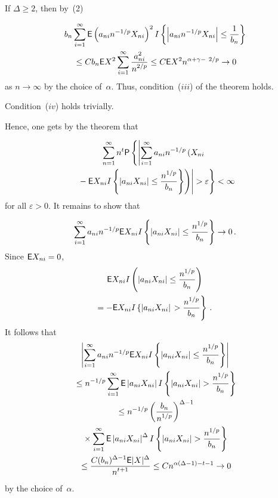 \begin{multicols}{2}
If $ \Delta\ge 2$, then by~(2)

\noindent
\begin{multline*}
b_n \sum\limits_{i=1}^\infty {\sf E}\left(a_{ni}n^{-1/p} X_{ni}\right)^2 I
\left\{\left|a_{ni}n^{-1/p} X_{ni}\right|\le\displaystyle\frac{\displaystyle 1\mathstrut}{\displaystyle b_n\mathstrut}\right\} \\
{}\le  C b_n {\sf E} X^2 \sum\limits_{i=1}^\infty \displaystyle\frac{\displaystyle a_{ni}^2\mathstrut}{\displaystyle n^{2/p}\mathstrut} 
\le C {\sf E} X^2 n^{\alpha +\gamma- \ 2/p} \to 0
\end{multline*}
as $n\to \infty$
by the choice of~$\alpha$. Thus, condition~($iii$) of the theorem holds.

Condition~($iv$) holds trivially.

Hence, one gets by the theorem that

\noindent
\begin{multline*}
\sum\limits_{n=1}^\infty n^t {\sf P}\left\{ \left|\sum\limits_{i=1}^\infty a_{ni}n^{-1/p} 
\left(X_{ni}\right.\right.\right.\\
\left.\left.\left.{}- {\sf E}X_{ni}I\left\{\left|a_{ni}X_{ni}\right|\le
\fr{n^{1/p}}{b_n}\right\}\right)\right|> \varepsilon \right\}<\infty
\end{multline*}
for all $\varepsilon>0$.
It remains to show that

\noindent
$$ 
\sum\limits_{i=1}^\infty a_{ni}n^{-1/p}  {\sf E}X_{ni}I
\left\{\left|a_{ni}X_{ni}\right|\le \displaystyle\frac{\displaystyle n^{1/p}\mathstrut}{\displaystyle b_n\mathstrut}\right\}\to 0\,. 
$$
Since ${\sf E}X_{ni}=0$,
\begin{multline*}
 {\sf E}X_{ni}I\left(|a_{ni}X_{ni}|\le \displaystyle\frac{\displaystyle n^{1/p}\mathstrut}{\displaystyle b_n\mathstrut}\right)\\=
-{\sf E}X_{ni}I\left\{|a_{ni}X_{ni}|\right.
\left.
>\displaystyle\frac{\displaystyle n^{1/p}\mathstrut}{\displaystyle b_n\mathstrut}\right\}\,.
\end{multline*}
It follows that
\begin{multline*}
\left|\sum\limits_{i=1}^\infty a_{ni}n^{-1/p} {\sf E}
X_{ni}I\left\{\left|a_{ni}X_{ni}\right|\le \fr{n^{1/p}}{b_n}\right\}\right|\\
{}\le n^{-1/p} \sum\limits_{i=1}^\infty   {\sf E}\left|a_{ni}X_{ni}\right| I
\left\{\left|a_{ni}X_{ni}\right|> \fr{n^{1/p}}{b_n}\right\}\\
{}\le n^{-1/p} \left(\fr{b_n}{n^{1/p}}\right)^{\Delta-1}\\
{}\times \sum\limits_{i=1}^\infty  
{\sf E}\left|a_{ni}X_{ni}\right|^{\Delta} I\left\{\left|a_{ni}X_{ni}\right|>
\fr{n^{1/p}}{b_n}\right\}\\
{}\le \fr{C  (b_n)^{\Delta-1} {\sf E}|X|^{\Delta}}{n^{t+1}} \le C n^{\alpha(\Delta-1)-t-1} \to 0
\end{multline*}
by the choice of~$\alpha$.


\end{multicols}

